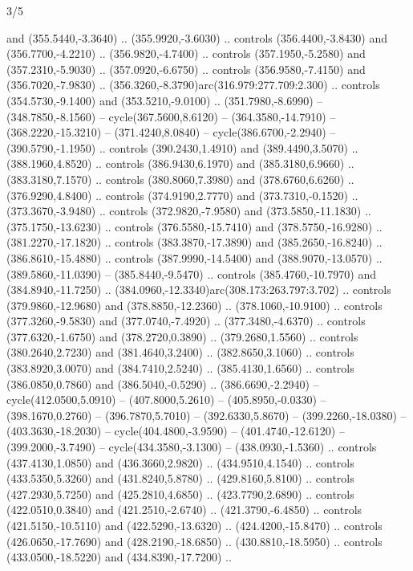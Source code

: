 \begin{flagdescription}{3/5}
\begin{scope} [xshift=0.5\flagwidth*\stretchfactor,yshift=0.5\flagwidth,scale=\flagwidth/391]
\begin{scope}[y=0.8pt, x=0.8pt, yscale=-1, xscale=1,line width=0.01\lw,shift={(-98.875,-338.125)}]
\begin{scope}[cm={{0.15382,0.0,0.0,0.15382,(34.72393,273.11413)}}]
  and (355.5440,-3.3640) .. (355.9920,-3.6030) .. controls (356.4400,-3.8430)
  and (356.7700,-4.2210) .. (356.9820,-4.7400) .. controls (357.1950,-5.2580)
  and (357.2310,-5.9030) .. (357.0920,-6.6750) .. controls (356.9580,-7.4150)
  and (356.7020,-7.9830) .. (356.3260,-8.3790)arc(316.979:277.709:2.300) ..
  controls (354.5730,-9.1400) and (353.5210,-9.0100) .. (351.7980,-8.6990) --
  (348.7850,-8.1560) -- cycle(367.5600,8.6120) -- (364.3580,-14.7910) --
  (368.2220,-15.3210) -- (371.4240,8.0840) -- cycle(386.6700,-2.2940) --
  (390.5790,-1.1950) .. controls (390.2430,1.4910) and (389.4490,3.5070) ..
  (388.1960,4.8520) .. controls (386.9430,6.1970) and (385.3180,6.9660) ..
  (383.3180,7.1570) .. controls (380.8060,7.3980) and (378.6760,6.6260) ..
  (376.9290,4.8400) .. controls (374.9190,2.7770) and (373.7310,-0.1520) ..
  (373.3670,-3.9480) .. controls (372.9820,-7.9580) and (373.5850,-11.1830) ..
  (375.1750,-13.6230) .. controls (376.5580,-15.7410) and (378.5750,-16.9280) ..
  (381.2270,-17.1820) .. controls (383.3870,-17.3890) and (385.2650,-16.8240) ..
  (386.8610,-15.4880) .. controls (387.9990,-14.5400) and (388.9070,-13.0570) ..
  (389.5860,-11.0390) -- (385.8440,-9.5470) .. controls (385.4760,-10.7970) and
  (384.8940,-11.7250) .. (384.0960,-12.3340)arc(308.173:263.797:3.702) ..
  controls (379.9860,-12.9680) and (378.8850,-12.2360) .. (378.1060,-10.9100) ..
  controls (377.3260,-9.5830) and (377.0740,-7.4920) .. (377.3480,-4.6370) ..
  controls (377.6320,-1.6750) and (378.2720,0.3890) .. (379.2680,1.5560) ..
  controls (380.2640,2.7230) and (381.4640,3.2400) .. (382.8650,3.1060) ..
  controls (383.8920,3.0070) and (384.7410,2.5240) .. (385.4130,1.6560) ..
  controls (386.0850,0.7860) and (386.5040,-0.5290) .. (386.6690,-2.2940) --
  cycle(412.0500,5.0910) -- (407.8000,5.2610) -- (405.8950,-0.0330) --
  (398.1670,0.2760) -- (396.7870,5.7010) -- (392.6330,5.8670) --
  (399.2260,-18.0380) -- (403.3630,-18.2030) -- cycle(404.4800,-3.9590) --
  (401.4740,-12.6120) -- (399.2000,-3.7490) -- cycle(434.3580,-3.1300) --
  (438.0930,-1.5360) .. controls (437.4130,1.0850) and (436.3660,2.9820) ..
  (434.9510,4.1540) .. controls (433.5350,5.3260) and (431.8240,5.8780) ..
  (429.8160,5.8100) .. controls (427.2930,5.7250) and (425.2810,4.6850) ..
  (423.7790,2.6890) .. controls (422.0510,0.3840) and (421.2510,-2.6740) ..
  (421.3790,-6.4850) .. controls (421.5150,-10.5110) and (422.5290,-13.6320) ..
  (424.4200,-15.8470) .. controls (426.0650,-17.7690) and (428.2190,-18.6850) ..
  (430.8810,-18.5950) .. controls (433.0500,-18.5220) and (434.8390,-17.7200) ..

\end{scope}
\end{scope}
\end{scope}
\end{flagdescription}
